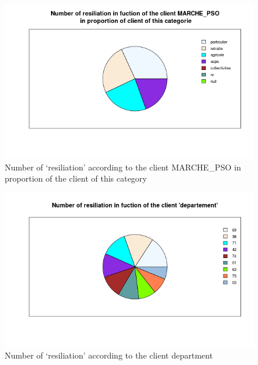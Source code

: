 \documentclass[a4paper, 11pt]{article}
\begin{document}
    \begin{figure}[!ht]
    	\centering
            \includegraphics[height = 10 cm]{Valentin/Number_of_resiliation_in_fuction_of_the_client_MARCHE_PSO_proportion.png}
            \caption{Number of `resiliation' according to the client MARCHE\_PSO in proportion of the client of this category}
            \label{fig:resiliation_pso2}
    \end{figure}
    
    \begin{figure}[!ht]
    	\centering
            \includegraphics[height = 10 cm]{Valentin/Number_of_resiliation_in_fuction_of_the_client_departement.png}
            \caption{Number of `resiliation' according to the client department}
            \label{fig:resiliation_dep1}
    \end{figure}
    
\end{document}
